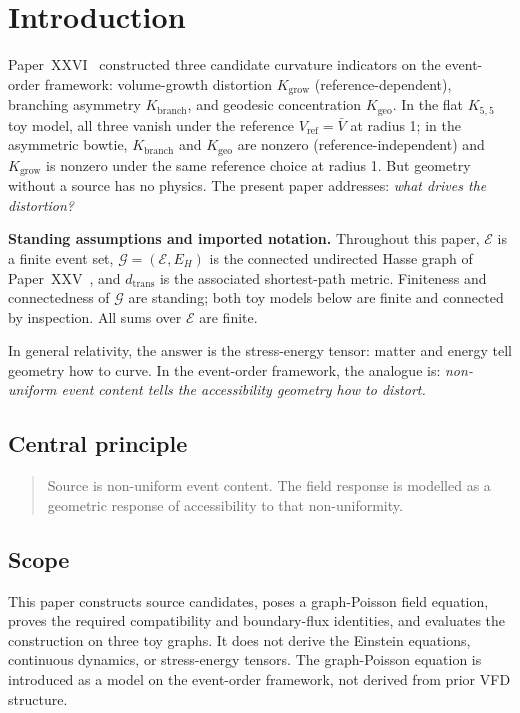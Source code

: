 \documentclass[12pt]{article}
\newcommand{\Ecal}{\mathcal{E}}
\newcommand{\Gcal}{\mathcal{G}}
\begin{document}
\section{Introduction}\label{sec:intro}

Paper~XXVI~\citep{SmartXXVI} constructed three candidate curvature indicators on the event-order framework: volume-growth distortion $K_{\mathrm{grow}}$ (reference-dependent), branching asymmetry $K_{\mathrm{branch}}$, and geodesic concentration $K_{\mathrm{geo}}$. In the flat $K_{5,5}$ toy model, all three vanish under the reference $V_{\mathrm{ref}} = \bar V$ at radius 1; in the asymmetric bowtie, $K_{\mathrm{branch}}$ and $K_{\mathrm{geo}}$ are nonzero (reference-independent) and $K_{\mathrm{grow}}$ is nonzero under the same reference choice at radius 1. But geometry without a source has no physics. The present paper addresses: \textit{what drives the distortion?}

\medskip
\noindent\textbf{Standing assumptions and imported notation.} Throughout this paper, $\Ecal$ is a finite event set, $\Gcal = (\Ecal, E_H)$ is the connected undirected Hasse graph of Paper~XXV~\citep{SmartXXV}, and $d_{\mathrm{trans}}$ is the associated shortest-path metric. Finiteness and connectedness of $\Gcal$ are standing; both toy models below are finite and connected by inspection. All sums over $\Ecal$ are finite.
\medskip


In general relativity, the answer is the stress-energy tensor: matter and energy tell geometry how to curve. In the event-order framework, the analogue is: \textit{non-uniform event content tells the accessibility geometry how to distort.}

\subsection*{Central principle}

\begin{quote}
Source is non-uniform event content. The field response is modelled as a geometric response of accessibility to that non-uniformity.
\end{quote}

\subsection*{Scope}

This paper constructs source candidates, poses a graph-Poisson field equation, proves the required compatibility and boundary-flux identities, and evaluates the construction on three toy graphs. It does not derive the Einstein equations, continuous dynamics, or stress-energy tensors. The graph-Poisson equation is introduced as a model on the event-order framework, not derived from prior VFD structure.
\end{document}
